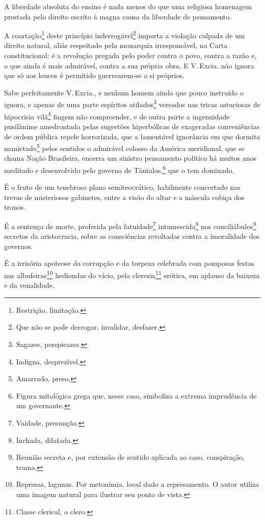 A liberdade absoluta do ensino é nada menos do que uma religiosa
homenagem prestada pelo direito escrito à magna causa da liberdade de
pensamento.

A coartação\footnote{Restrição, limitação.} deste princípio
inderrogável\footnote{Que não se pode derrogar, invalidar, desfazer.}
importa a violação culpada de um direito natural, aliás respeitado pela
monarquia irresponsável, na Carta constitucional: é a revolução pregada
pelo poder contra o povo, contra a razão e, o que ainda é mais
admirável, contra a sua própria obra. E V.\,Excia. não ignora que só aos
loucos é permitido guerrearem-se a si próprios.

Sabe perfeitamente V.\,Excia., e nenhum homem ainda que pouco instruído o
ignora, e apenas de uma parte espíritos atilados\footnote{Sagazes,
  perspicazes.} versados nas tricas astuciosas de hipocrisia
vilã\footnote{Indigna, desprezível.} fingem não compreender, e de
outra parte a ingenuidade pusilânime amedrontada pelas sugestões
hiperbólicas de exageradas conveniências de ordem pública repele
horrorizada, que a lamentável ignorância em que dormita
manietado\footnote{Amarrado, preso.} pelos sentidos o admirável
colosso da América meridional, que se chama Nação Brasileira, encerra um
sinistro pensamento político há muitos anos meditado e desenvolvido pelo
governo de Tântalos,\footnote{Figura mitológica grega que, nesse caso,
  simboliza a extrema imprudência de um governante.} que o tem
dominado.

É o fruto de um tenebroso plano semiteocrático, habilmente concertado
nas trevas de misteriosos gabinetes, entre a visão do altar e a máscula
cobiça dos tronos.

É a sentença de morte, proferida pela fatuidade\footnote{Vaidade,
  presunção.} intumescida\footnote{Inchada, dilatada.} nos
conciliábulos\footnote{Reunião secreta e, por extensão de sentido
  aplicada ao caso, conspiração, trama.} secretos da aristocracia, sobre
as consciências revoltadas contra a imoralidade dos governos.

É a irrisória apoteose da corrupção e da torpeza celebrada com pomposas
festas nas albufeiras\footnote{Represas, lagunas. Por metonímia, local
  dado a represamento. O autor utiliza uma imagem natural para ilustrar
  seu ponto de vista.} hediondas do vício, pela clerezia\footnote{
  Classe clerical, o clero.} erótica, em aplauso da baixeza e da
venalidade.

